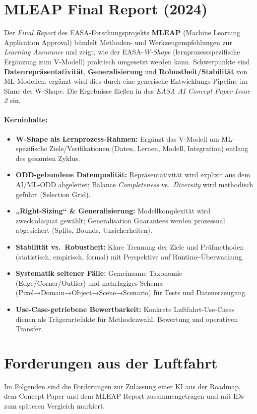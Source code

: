 \section{MLEAP Final Report (2024) \parencite{easa-mleap-final-2024}}
Der \emph{Final Report} des EASA-Forschungsprojekts \textbf{MLEAP} (Machine Learning Application Approval) bündelt Methoden- und Werkzeugempfehlungen zur \emph{Learning Assurance} und zeigt, wie der EASA-\emph{W-Shape} (lernprozessspezifische Ergänzung zum V-Modell) praktisch umgesetzt werden kann. Schwerpunkte sind \textbf{Datenrepräsentativität}, \textbf{Generalisierung} und \textbf{Robustheit/Stabilität} von ML-Modellen; ergänzt wird dies durch eine generische Entwicklungs-Pipeline im Sinne des W-Shape. Die Ergebnisse fließen in das \emph{EASA AI Concept Paper Issue 2} ein.

\paragraph{Kerninhalte:}
\begin{itemize}
  \item \textbf{W-Shape als Lernprozess-Rahmen:} Ergänzt das V-Modell um ML-spezifische Ziele/Verifikationen (Daten, Lernen, Modell, Integration) entlang des gesamten Zyklus.
  \item \textbf{ODD-gebundene Datenqualität:} Repräsentativität wird explizit aus dem AI/ML-ODD abgeleitet; Balance \emph{Completeness} vs.\ \emph{Diversity} wird methodisch geführt (Selection Grid).
  \item \textbf{„Right-Sizing“ \& Generalisierung:} Modellkomplexität wird zweckadäquat gewählt; Generalisation Guarantees werden prozessual abgesichert (Splits, Bounds, Unsicherheiten).
  \item \textbf{Stabilität vs.\ Robustheit:} Klare Trennung der Ziele und Prüfmethoden (statistisch, empirisch, formal) mit Perspektive auf Runtime-Überwachung.
  \item \textbf{Systematik seltener Fälle:} Gemeinsame Taxonomie (Edge/Corner/Outlier) und mehrlagiges Schema (Pixel→Domain→Object→Scene→Scenario) für Tests und Datenerzeugung.
  \item \textbf{Use-Case-getriebene Bewertbarkeit:} Konkrete Luftfahrt-Use-Cases dienen als Trägerartefakte für Methodenwahl, Bewertung und operativen Transfer.
\end{itemize}


\section{Forderungen aus der Luftfahrt}
Im Folgenden sind die Forderungen zur Zulassung einer KI aus der Roadmap, dem Concept Paper und dem MLEAP Report 
zusammengetragen und mit IDs zum späteren Vergleich markiert.

